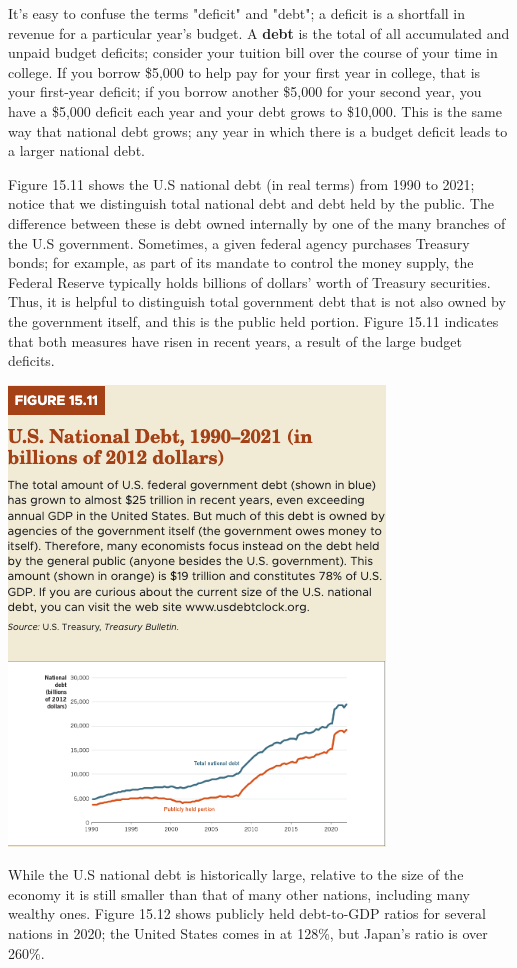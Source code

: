 \documentclass[11pt]{article} %
\begin{document}
It's easy to confuse the terms "deficit" and "debt"; a deficit is a shortfall in revenue for a particular year's budget. A \textbf{debt} is the total of all accumulated and unpaid budget deficits; consider your tuition bill over the course of your time in college. If you borrow \$5,000 to help pay for your first year in college, that is your first-year deficit; if you borrow another \$5,000 for your second year, you have a \$5,000 deficit each year and your debt grows to \$10,000. This is the same way that national debt grows; any year in which there is a budget deficit leads to a larger national debt.

Figure 15.11 shows the U.S national debt (in real terms) from 1990 to 2021; notice that we distinguish total national debt and debt held by the public. The difference between these is debt owned internally by one of the many branches of the U.S government. Sometimes, a given federal agency purchases Treasury bonds; for example, as part of its mandate to control the money supply, the Federal Reserve typically holds billions of dollars' worth of Treasury securities. Thus, it is helpful to distinguish total government debt that is not also owned by the government itself, and this is the public held portion. Figure 15.11 indicates that both measures have risen in recent years, a result of the large budget deficits.

\begin{center}
\includegraphics[scale=0.5]{images/Figure 15.11.png}
\end{center}
While the U.S national debt is historically large, relative to the size of the economy it is still smaller than that of many other nations, including many wealthy ones. Figure 15.12 shows publicly held debt-to-GDP ratios for several nations in 2020; the United States comes in at 128\%, but Japan's ratio is over 260\%.
\end{document}
